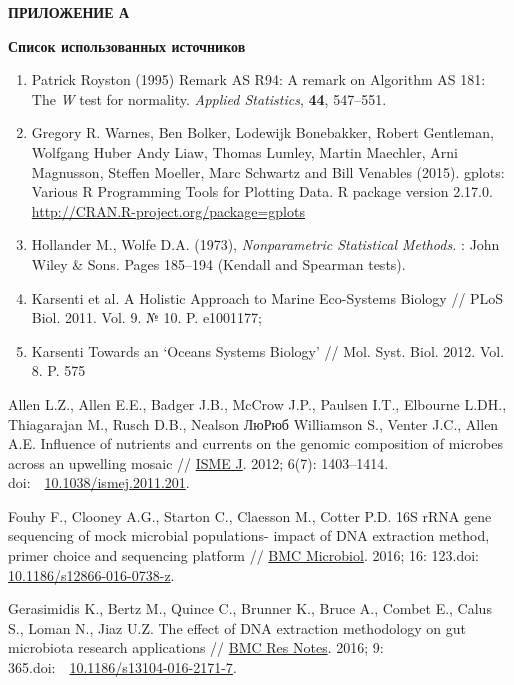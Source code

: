 \documentclass[a4paper,12pt,openany,final]{extreport}
\begin{document}
\textbf{ПРИЛОЖЕНИЕ А}

\textbf{Список использованных источников}

\begin{enumerate}
\def\labelenumi{\arabic{enumi}.}
\item
  Patrick Royston (1995) Remark AS R94: A remark on Algorithm AS 181:
  The \emph{W} test for normality. \emph{Applied Statistics},
  \textbf{44}, 547--551.
\item
  Gregory R. Warnes, Ben Bolker, Lodewijk Bonebakker, Robert Gentleman,
  Wolfgang Huber Andy Liaw, Thomas Lumley, Martin Maechler, Arni
  Magnusson, Steffen Moeller, Marc Schwartz and Bill Venables (2015).
  gplots: Various R Programming Tools for Plotting Data. R package
  version 2.17.0.
  \href{http://CRAN.R-project.org/package=gplots}{{http://CRAN.R-project.org/package=gplots}}
\item
  Hollander M., Wolfe D.A. (1973), \emph{Nonparametric Statistical
  Methods.} : John Wiley \& Sons. Pages 185--194 (Kendall and Spearman
  tests).
\item
  Karsenti et al. A Holistic Approach to Marine Eco-Systems Biology //
  PLoS Biol. 2011. Vol. 9. № 10. P. e1001177;
\item
  Karsenti Towards an `Oceans Systems Biology' // Mol. Syst. Biol. 2012.
  Vol. 8. P. 575
\end{enumerate}

Allen L.Z., Allen E.E., Badger J.B., McCrow J.P., Paulsen I.T., Elbourne
L.DH., Thiagarajan M., Rusch D.B., Nealson ЛюРюб Williamson S., Venter
J.C., Allen A.E. Influence of nutrients and currents on the genomic
composition of microbes across an upwelling mosaic //
\href{https://www.ncbi.nlm.nih.gov/pmc/articles/PMC3379637/}{ISME J}.
2012; 6(7): 1403--1414.
doi:~~\href{https://dx.doi.org/10.1038\%2Fismej.2011.201}{10.1038/ismej.2011.201}.

Fouhy F., Clooney A.G., Starton C., Claesson M., Cotter P.D. 16S rRNA
gene sequencing of mock microbial populations- impact of DNA extraction
method, primer choice and sequencing platform //
\href{https://www.ncbi.nlm.nih.gov/pmc/articles/PMC4921037/}{BMC
Microbiol}. 2016; 16: 123.doi:
\href{https://dx.doi.org/10.1186\%2Fs12866-016-0738-z}{10.1186/s12866-016-0738-z}.

Gerasimidis K., Bertz M., Quince C., Brunner K., Bruce A., Combet E.,
Calus S., Loman N., Jiaz U.Z. The effect of DNA extraction methodology
on gut microbiota research applications //
\href{https://www.ncbi.nlm.nih.gov/pmc/articles/PMC4960752/}{BMC Res
Notes}. 2016; 9:
365.doi:~~\href{https://dx.doi.org/10.1186\%2Fs13104-016-2171-7}{10.1186/s13104-016-2171-7}.
\end{document}
